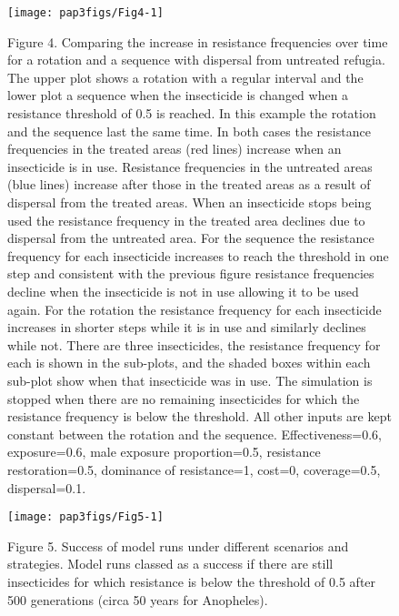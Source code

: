 \documentclass[11pt,]{article}
\begin{document}
\pagebreak

\begin{figure}

{\centering \texttt{[image: pap3figs/Fig4-1]} 

}

\caption{Figure 4. Comparing the increase in resistance frequencies over time for a rotation and a sequence with dispersal from untreated refugia. The upper plot shows a rotation with a regular interval and the lower plot a sequence when the insecticide is changed when a resistance threshold of 0.5 is reached. In this example the rotation and the sequence last the same time. In both cases the resistance frequencies in the treated areas (red lines) increase when an insecticide is in use. Resistance frequencies in the untreated areas (blue lines) increase after those in the treated areas as a result of dispersal from the treated areas. When an insecticide stops being used the resistance frequency in the treated area declines due to dispersal from the untreated area. For the sequence the resistance frequency for each insecticide increases to reach the threshold in one step and consistent with the previous figure resistance frequencies decline when the insecticide is not in use allowing it to be used again. For the rotation the resistance frequency for each insecticide increases in shorter steps while it is in use and similarly declines while not. There are three insecticides, the resistance frequency for each is shown in the sub-plots, and the shaded boxes within each sub-plot show when that insecticide was in use. The simulation is stopped when there are no remaining insecticides for which the resistance frequency is below the threshold. All other inputs are kept constant between the rotation and the sequence. Effectiveness=0.6, exposure=0.6, male exposure proportion=0.5, resistance restoration=0.5, dominance of resistance=1, cost=0, coverage=0.5, dispersal=0.1.}\label{fig:Fig4}
\end{figure}

\pagebreak

\begin{figure}

{\centering \texttt{[image: pap3figs/Fig5-1]} 

}

\caption{Figure 5. Success of model runs under different scenarios and strategies. Model runs classed as a success if there are still insecticides for which resistance is below the threshold of 0.5 after 500 generations (circa 50 years for Anopheles).}\label{fig:Fig5}
\end{figure}
\end{document}
